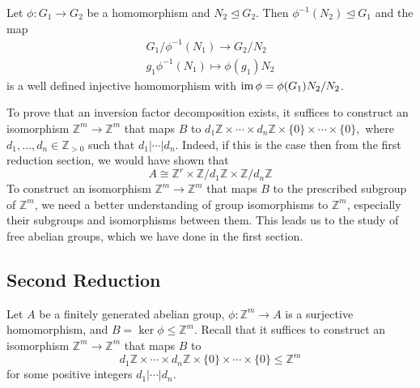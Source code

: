 \documentclass{article}
\begin{document}
\begin{idea}
    Let $\phi: G_1\rightarrow G_2$ be a homomorphism and $N_2 \trianglelefteq G_2$. Then $\phi^{-1}(N_2) \trianglelefteq G_1$ and the map 
    \begin{align*}
        G_1/\phi^{-1}(N_1) \rightarrow G_2/N_2 \\ 
        g_1\phi^{-1}(N_1) \mapsto \phi(g_1)N_2
    \end{align*}
    is a well defined injective homomorphism with $\operatorname{im}{\phi}=\phi(G_1)N_2/N_2$.
\end{idea}
To prove that an inversion factor decomposition exists, it suffices to construct an isomorphism $\mathbb{Z}^m \rightarrow \mathbb{Z}^m$ that maps $B$ to $d_1\mathbb{Z} \times \cdots \times d_n\mathbb{Z} \times \{0\} \times \cdots \times \{0\},$ where $d_1,\dots,d_n \in \mathbb{Z}_{>0}$ such that $d_1|\cdots|d_n$. Indeed, if this is the case then from the first reduction section, we would have shown that
\begin{equation}
    A \cong \mathbb{Z}^r \times \mathbb{Z}/d_1\mathbb{Z} \times \mathbb{Z}/d_n\mathbb{Z}
\end{equation}
To construct an isomorphism $\mathbb{Z}^m \rightarrow \mathbb{Z}^m$ that maps $B$ to the prescribed subgroup of $\mathbb{Z}^m$, we need a better understanding of group isomorphisms to $\mathbb{Z}^m$, especially their subgroups and isomorphisms between them. This leads us to the study of free abelian groups, which we have done in the first section.

\subsection{Second Reduction}
Let $A$ be a finitely generated abelian group, $\phi: \mathbb{Z}^m \rightarrow A$ is a surjective homomorphism, and $B=\ker\phi \le \mathbb{Z}^m$. Recall that it suffices to construct an isomorphism $\mathbb{Z}^m \rightarrow \mathbb{Z}^m$ that maps $B$ to $$d_1\mathbb{Z} \times \cdots \times d_n\mathbb{Z} \times \{0\} \times \cdots \times \{0\} \le \mathbb{Z}^m$$
for some positive integers $d_1|\cdots | d_n$.
\end{document}
